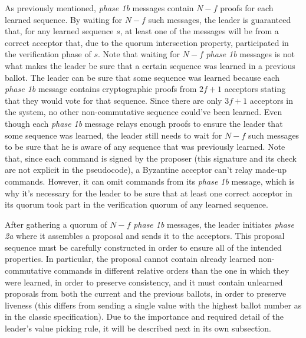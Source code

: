 As previously mentioned, \textit{phase 1b} messages contain $N-f$ proofs for each learned sequence. By waiting for $N-f$ such messages, the leader is guaranteed that, for any learned sequence $s$, at least one of the messages will be from a correct acceptor that, due to the quorum intersection property, participated in the verification phase of $s$. Note that waiting for $N-f$ \textit{phase 1b} messages is not what makes the leader be sure that a certain sequence was learned in a previous ballot. The leader can be sure that some sequence was learned because each \textit{phase 1b} message contains cryptographic proofs from $2f+1$ acceptors stating that they would vote for that sequence. Since there are only $3f+1$ acceptors in the system, no other non-commutative sequence could've been learned. Even though each \textit{phase 1b} message relays enough proofs to ensure the leader that some sequence was learned, the leader still needs to wait for $N-f$ such messages to be sure that he is aware of any sequence that was previously learned. Note that, since each command is signed by the proposer (this signature and its check are not explicit in the pseudocode), a Byzantine acceptor can't relay made-up commands. However, it can omit commands from its \textit{phase 1b} message, which is why it's necessary for the leader to be sure that at least one correct acceptor in its quorum took part in the verification quorum of any learned sequence. \par
After gathering a quorum of $N-f$ \textit{phase 1b} messages, the leader initiates \textit{phase 2a} where it assembles a proposal and sends it to the acceptors. This proposal sequence must be carefully constructed in order to ensure all of the intended properties. In particular, the proposal cannot contain already learned non-commutative commands in different relative orders than the one in which they were learned, in order to preserve consistency, and it must contain unlearned proposals from both the current and the previous ballots, in order to preserve liveness (this differs from sending a single value with the highest ballot number as in the classic specification). Due to the importance and required detail of the leader's value picking rule, it will be described next in its own subsection. \par
